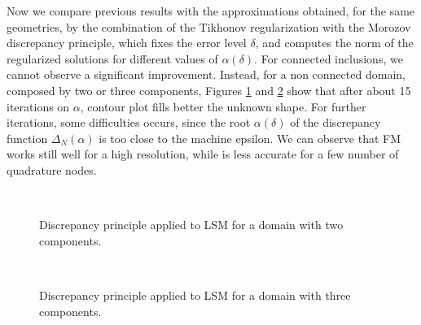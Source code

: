 



Now we compare previous results with the approximations obtained, for the same geometries, by the 
combination of the Tikhonov regularization with the Morozov discrepancy principle, which fixes the 
error level $\delta$, and computes the norm of the regularized solutions for different values of 
$\alpha(\delta)$. For connected inclusions, we cannot observe a significant improvement. 
Instead, for a non connected domain, composed by two or three components, Figures \ref{fig:discrepancy_two_ellipse} 
and \ref{fig:discrepancy_three_ellipse}
show that after about 15 iterations on $\alpha$, contour plot fills better the unknown shape.
For further iterations, some difficulties occurs, since the root $\alpha(\delta)$ of the discrepancy 
function $\Delta_N(\alpha)$ is too close to the machine epsilon. 
We can observe that FM works still well for a high resolution, while is less accurate for a few 
number of quadrature nodes.
\begin{center}
\begin{figure}%
\\
\caption{Discrepancy principle applied to LSM for a domain with two components.}
\label{fig:discrepancy_two_ellipse}
\end{figure}
\end{center}

\begin{center}
\begin{figure}%
\\
\caption{Discrepancy principle applied to LSM for a domain with three components.}
\label{fig:discrepancy_three_ellipse}
\end{figure}
\end{center}

